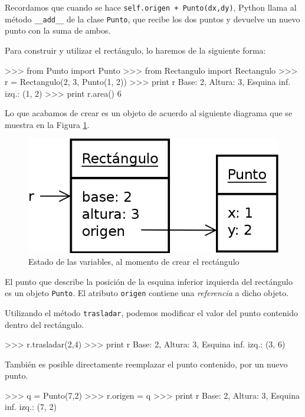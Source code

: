 Recordamos que cuando se hace \lstinline!self.origen + Punto(dx,dy)!,
Python llama al método \lstinline!__add__! de la clase \lstinline!Punto!,
que recibe los dos puntos y devuelve un nuevo punto con la suma de ambos.

Para construir y utilizar el rectángulo, lo haremos de la siguiente forma:

\begin{codigo-python-sn}
>>> from Punto import Punto
>>> from Rectangulo import Rectangulo
>>> r = Rectangulo(2, 3, Punto(1, 2))
>>> print r
Base: 2, Altura: 3, Esquina inf. izq.: (1, 2) 
>>> print r.area()
6
\end{codigo-python-sn}

Lo que acabamos de crear es un objeto de acuerdo al siguiente diagrama que
se muestra en la Figura \ref{rectangulo_punto}.

\begin{figure}[htb]
\label{rectangulo_punto}
\includegraphics{graficos/15_Rectangulo_Punto}
\caption{Estado de las variables, al momento de crear el rectángulo}
\end{figure}

El punto que describe la posición de la esquina inferior izquierda del
rectángulo es un objeto \lstinline!Punto!. El atributo \lstinline!origen!
contiene una {\it referencia} a dicho objeto.

Utilizando el método \lstinline!trasladar!, podemos modificar el valor del
punto contenido dentro del rectángulo.

\begin{codigo-python-sn}
>>> r.trasladar(2,4)
>>> print r
Base: 2, Altura: 3, Esquina inf. izq.: (3, 6) 
\end{codigo-python-sn}

También es posible directamente reemplazar el punto contenido, por un nuevo
punto.

\begin{codigo-python-sn}
>>> q = Punto(7,2)
>>> r.origen = q
>>> print r
Base: 2, Altura: 3, Esquina inf. izq.: (7, 2)
\end{codigo-python-sn}

